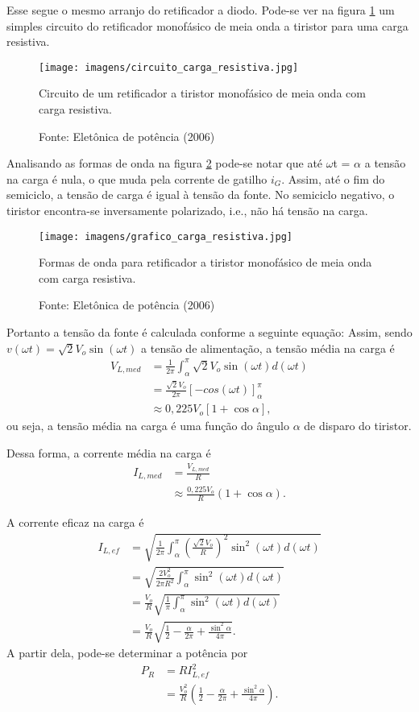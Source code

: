 Esse segue o mesmo arranjo do retificador a diodo. Pode-se ver na figura \ref{ccr} um simples circuito do retificador monofásico de meia onda a tiristor para uma carga resistiva. 

\begin{figure}[h]
\center
\texttt{[image: imagens/circuito\_carga\_resistiva.jpg]}
\caption{Circuito de um retificador a tiristor monofásico de meia onda com carga resistiva.}\label{ccr}
\caption*{Fonte: Eletônica de potência (2006)}
\end{figure}
  
Analisando as formas de onda na figura \ref{gcr} pode-se notar que até $\omega${t} = $\alpha$ a tensão na carga é nula, o que muda pela corrente de gatilho $i_{G}$. Assim, até o fim do semiciclo, a tensão de carga é igual à tensão da fonte. No semiciclo negativo, o tiristor encontra-se inversamente polarizado, i.e., não há tensão na carga.

\begin{figure}[h]
\center
\texttt{[image: imagens/grafico\_carga\_resistiva.jpg]}
\caption{Formas de onda para retificador a tiristor monofásico de meia onda com carga resistiva.}\label{gcr}
\caption*{Fonte: Eletônica de potência (2006)}
\end{figure}

Portanto a tensão da fonte é calculada conforme a seguinte equação:
Assim, sendo $v(\omega t)=\sqrt{2}V_o\sin(\omega t)$ a tensão de alimentação, a tensão média na carga é
\begin{align*}
    V_{L,med} &= \frac{1}{2\pi}\int_\alpha^{\pi}\sqrt{2}V_o\sin(\omega t)d(\omega t) \\
&= \frac{\sqrt{2}V_o}{2\pi}[-cos(\omega t)]_\alpha^{\pi} \\
&\approx 0,225 V_o[1+\cos\alpha]
,\end{align*}
ou seja, a tensão média na carga é uma função do ângulo $\alpha$ de disparo do tiristor.

Dessa forma, a corrente média na carga é
\begin{align*}
    I_{L,med} &= \frac{V_{L,med}}{R} \\
    &\approx \frac{0,225 V_o}{R}(1+\cos\alpha)
.\end{align*}

A corrente eficaz na carga é
\begin{align*}
    I_{L,ef}&=\sqrt{\frac{1}{2\pi}\int_{\alpha}^{\pi}(\frac{\sqrt{2}V_o}{R})^{2}\sin^{2}(\omega t)d(\omega t)} \\
&=\sqrt{\frac{2V_o^{2}}{2\pi R^{2}}\int_{\alpha}^{\pi}\sin^2(\omega t)d(\omega t)} \\
&=\frac{V_o}{R}\sqrt{\frac{1}{\pi}\int_{\alpha}^{\pi}\sin^2(\omega t)d(\omega t)} \\
&=\frac{V_o}{R}\sqrt{\frac{1}{2}-\frac{\alpha}{2\pi}+\frac{\sin^2\alpha}{4\pi}}
.\end{align*}
A partir dela, pode-se determinar a potência por
\begin{align*}
    P_{R}&=RI_{L,ef}^{2} \\
	 &=\frac{V_{o}^{2}}{R}\left(   \frac{1}{2}-\frac{\alpha}{2\pi}+\frac{\sin^2\alpha}{4\pi}\right)
.\end{align*}

